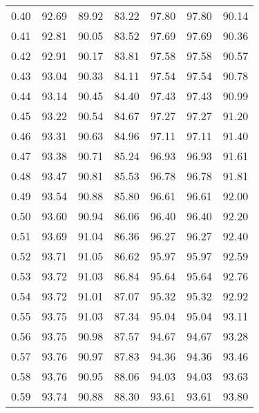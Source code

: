 \begin{tabular}{|c|c|c|c|c|c|c|}
      0.40 &     92.69 &     89.92 &      83.22 &   97.80 &      97.80 &         90.14 \\
      0.41 &     92.81 &     90.05 &      83.52 &   97.69 &      97.69 &         90.36 \\
      0.42 &     92.91 &     90.17 &      83.81 &   97.58 &      97.58 &         90.57 \\
      0.43 &     93.04 &     90.33 &      84.11 &   97.54 &      97.54 &         90.78 \\
      0.44 &     93.14 &     90.45 &      84.40 &   97.43 &      97.43 &         90.99 \\
      0.45 &     93.22 &     90.54 &      84.67 &   97.27 &      97.27 &         91.20 \\
      0.46 &     93.31 &     90.63 &      84.96 &   97.11 &      97.11 &         91.40 \\
      0.47 &     93.38 &     90.71 &      85.24 &   96.93 &      96.93 &         91.61 \\
      0.48 &     93.47 &     90.81 &      85.53 &   96.78 &      96.78 &         91.81 \\
      0.49 &     93.54 &     90.88 &      85.80 &   96.61 &      96.61 &         92.00 \\
      0.50 &     93.60 &     90.94 &      86.06 &   96.40 &      96.40 &         92.20 \\
      0.51 &     93.69 &     91.04 &      86.36 &   96.27 &      96.27 &         92.40 \\
      0.52 &     93.71 &     91.05 &      86.62 &   95.97 &      95.97 &         92.59 \\
      0.53 &     93.72 &     91.03 &      86.84 &   95.64 &      95.64 &         92.76 \\
      0.54 &     93.72 &     91.01 &      87.07 &   95.32 &      95.32 &         92.92 \\
      0.55 &     93.75 &     91.03 &      87.34 &   95.04 &      95.04 &         93.11 \\
      0.56 &     93.75 &     90.98 &      87.57 &   94.67 &      94.67 &         93.28 \\
      0.57 &     93.76 &     90.97 &      87.83 &   94.36 &      94.36 &         93.46 \\
      0.58 &     93.76 &     90.95 &      88.06 &   94.03 &      94.03 &         93.63 \\
      0.59 &     93.74 &     90.88 &      88.30 &   93.61 &      93.61 &         93.80 \\

\end{tabular}
